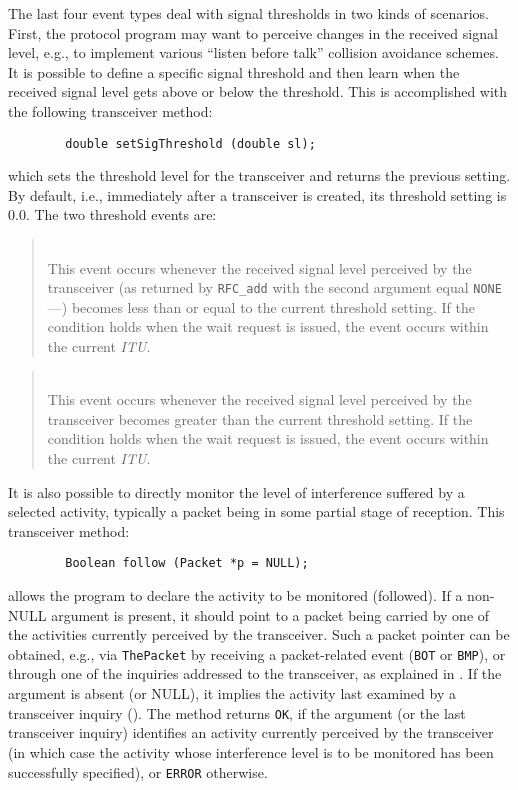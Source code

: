 The last four event types deal with signal thresholds in two kinds of
scenarios.
First, the protocol program may want to perceive changes in the received signal
level, e.g., to implement various ``listen before talk'' collision avoidance
schemes.
It is possible to define a specific signal threshold and then learn when the
received signal level gets above or below the threshold.
This is accomplished with the following transceiver method:
\begin{verbatim}
        double setSigThreshold (double sl);
\end{verbatim}
\noindent
which sets the threshold level for the transceiver and returns the previous
setting.
By default, i.e., immediately after a transceiver is created, its threshold
setting is 0.0.
The two threshold events are:

\begin{quote}
\noindent{}\\ \hspace{0in}
This event occurs whenever the received signal level perceived by the
transceiver (as returned by {\tt RFC\_add} with the second argument equal
{\tt NONE}---)
becomes less than or equal to the current threshold setting.
If the condition holds when the wait request is issued, the event occurs
within the current {\em ITU}.
\end{quote}

\begin{quote}
\noindent{}\\ \hspace{0in}
This event occurs whenever the received signal level perceived by the
transceiver becomes greater than the current threshold setting.
If the condition holds when the wait request is issued, the event occurs
within the current {\em ITU}.
\end{quote}

It is also possible to directly monitor the level of interference suffered by
a selected activity, typically a packet being in some partial stage of
reception.
This transceiver method:
\begin{verbatim}
        Boolean follow (Packet *p = NULL);
\end{verbatim}
allows the program to declare the activity to be monitored (followed).
If a non-NULL argument is present, it should point to a packet being carried
by one of the activities currently perceived by the transceiver.
Such a packet pointer can be obtained, e.g., via {\tt ThePacket} by receiving
a packet-related event ({\tt BOT} or {\tt BMP}), or through one of the
inquiries addressed to the transceiver, as explained in .
If the argument is absent (or NULL), it implies the activity last
examined by a transceiver inquiry ().
The method returns {\tt OK}, if the argument (or the
last transceiver inquiry) identifies an activity currently perceived by
the transceiver (in which case the activity whose interference level is to
be monitored has been successfully specified), or {\tt ERROR} otherwise.

